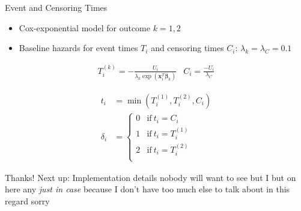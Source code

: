 \documentclass{beamer}
\providecommand{\tightlist}{%
  \setlength{\itemsep}{0pt}\setlength{\parskip}{0pt}}
\begin{document}
\begin{frame}{Event and Censoring Times}
\protect\hypertarget{event-and-censoring-times}{}
\begin{itemize}
\tightlist
\item
  Cox-exponential model for outcome \(k = 1,2\)
\item
  Baseline hazards for event times \(T_i\) and censoring times \(C_i\):
  \(\lambda_k = \lambda_C = 0.1\)
\end{itemize}

\begin{align}
T_i^{(k)} = -\frac{U_i}{\lambda_k \exp(\mathbf{x}^{T}_i\boldsymbol{\beta}_k)} &
C_i       = \frac{-U_i}{\lambda_C}
\end{align}

\begin{align}
t_i &= \min(T_i^{(1)}, T_i^{(2)}, C_i) \\[0.5pt]
\delta_i &= \begin{cases}
0 & \text{if}\ t_i = C_i \\
1 & \text{if}\ t_i = T_i^{(1)} \\
2 & \text{if}\ t_i = T_i^{(2)} \\
\end{cases}
\end{align}
\end{frame}

\begin{frame}{Thanks!}
\protect\hypertarget{thanks}{}
Next up: Implementation details nobody will want to see but I but on
here any \emph{just in case} because I don't have too much else to talk
about in this regard sorry
\end{frame}
\end{document}
